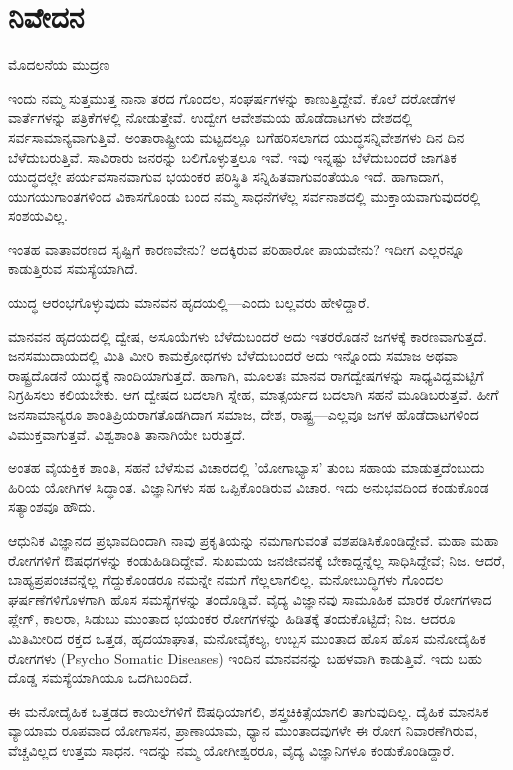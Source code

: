 
\chapter*{ನಿವೇದನ}

\begin{center}
ಮೊದಲನೆಯ ಮುದ್ರಣ
\end{center}

ಇಂದು ನಮ್ಮ ಸುತ್ತಮುತ್ತ ನಾನಾ ತರದ ಗೊಂದಲ, ಸಂಘರ್ಷಗಳನ್ನು ಕಾಣುತ್ತಿದ್ದೇವೆ. ಕೊಲೆ ದರೋಡೆಗಳ ವಾರ್ತೆಗಳನ್ನು ಪತ್ರಿಕೆಗಳಲ್ಲಿ ನೋಡುತ್ತೇವೆ. ಉದ್ವೇಗ ಆವೇಶಮಯ ಹೊಡೆದಾಟಗಳು ದೇಶದಲ್ಲಿ ಸರ್ವಸಾಮಾನ್ಯವಾಗುತ್ತಿವೆ. ಅಂತಾರಾಷ್ಟ್ರೀಯ ಮಟ್ಟದಲ್ಲೂ ಬಗೆಹರಿಸಲಾಗದ ಯುದ್ಧಸನ್ನಿವೇಶಗಳು ದಿನ ದಿನ ಬೆಳೆದುಬರುತ್ತಿವೆ. ಸಾವಿರಾರು ಜನರನ್ನು ಬಲಿಗೊಳ್ಳುತ್ತಲೂ ಇವೆ. ಇವು ಇನ್ನಷ್ಟು ಬೆಳೆದುಬಂದರೆ ಜಾಗತಿಕ ಯುದ್ಧದಲ್ಲೇ ಪರ್ಯವಸಾನವಾಗುವ ಭಯಂಕರ ಪರಿಸ್ಥಿತಿ ಸನ್ನಿಹಿತವಾಗುವಂತೆಯೂ ಇದೆ. ಹಾಗಾದಾಗ, ಯುಗಯುಗಾಂತಗಳಿಂದ ವಿಕಾಸಗೊಂಡು ಬಂದ ನಮ್ಮ ಸಾಧನೆಗಳೆಲ್ಲ ಸರ್ವನಾಶದಲ್ಲಿ ಮುಕ್ತಾಯವಾಗುವುದರಲ್ಲಿ ಸಂಶಯವಿಲ್ಲ.

ಇಂತಹ ವಾತಾವರಣದ ಸೃಷ್ಟಿಗೆ ಕಾರಣವೇನು? ಅದಕ್ಕಿರುವ ಪರಿಹಾರೋ ಪಾಯವೇನು? ಇದೀಗ ಎಲ್ಲರನ್ನೂ ಕಾಡುತ್ತಿರುವ ಸಮಸ್ಯೆಯಾಗಿದೆ.

 ಯುದ್ಧ ಆರಂಭಗೊಳ್ಳುವುದು ಮಾನವನ ಹೃದಯಲ್ಲಿ—ಎಂದು ಬಲ್ಲವರು ಹೇಳಿದ್ದಾರೆ.

ಮಾನವನ ಹೃದಯದಲ್ಲಿ ದ್ವೇಷ, ಅಸೂಯೆಗಳು ಬೆಳೆದುಬಂದರೆ ಅದು ಇತರರೊಡನೆ ಜಗಳಕ್ಕೆ ಕಾರಣವಾಗುತ್ತದೆ. ಜನಸಮುದಾಯದಲ್ಲಿ ಮಿತಿ ಮೀರಿ ಕಾಮಕ್ರೋಧಗಳು ಬೆಳೆದುಬಂದರೆ ಅದು ಇನ್ನೊಂದು ಸಮಾಜ ಅಥವಾ ರಾಷ್ಟ್ರದೊಡನೆ ಯುದ್ಧಕ್ಕೆ ನಾಂದಿಯಾಗುತ್ತದೆ. ಹಾಗಾಗಿ, ಮೂಲತಃ ಮಾನವ ರಾಗದ್ವೇಷಗಳನ್ನು ಸಾಧ್ಯವಿದ್ದಮಟ್ಟಿಗೆ ನಿಗ್ರಹಿಸಲು ಕಲಿಯಬೇಕು. ಆಗ ದ್ವೇಷದ ಬದಲಾಗಿ ಸ್ನೇಹ, ಮಾತ್ಸರ್ಯದ ಬದಲಾಗಿ ಸಹನೆ ಮೂಡಿಬರುತ್ತವೆ. ಹೀಗೆ ಜನಸಾಮಾನ್ಯರೂ ಶಾಂತಿಪ್ರಿಯರಾಗತೊಡಗಿದಾಗ ಸಮಾಜ, ದೇಶ, ರಾಷ್ಟ್ರ—ಎಲ್ಲವೂ ಜಗಳ ಹೊಡೆದಾಟಗಳಿಂದ ವಿಮುಕ್ತವಾಗುತ್ತವೆ. ವಿಶ್ವಶಾಂತಿ ತಾನಾಗಿಯೇ ಬರುತ್ತದೆ.

ಅಂತಹ ವೈಯಕ್ತಿಕ ಶಾಂತಿ, ಸಹನೆ ಬೆಳೆಸುವ ವಿಚಾರದಲ್ಲಿ 'ಯೋಗಾಭ್ಯಾಸ' ತುಂಬ ಸಹಾಯ ಮಾಡುತ್ತದೆಂಬುದು ಹಿರಿಯ ಯೋಗಿಗಳ ಸಿದ್ಧಾಂತ. ವಿಜ್ಞಾನಿಗಳು ಸಹ ಒಪ್ಪಿಕೊಂಡಿರುವ ವಿಚಾರ. ಇದು ಅನುಭವದಿಂದ ಕಂಡುಕೊಂಡ ಸತ್ಯಾಂಶವೂ ಹೌದು.

ಆಧುನಿಕ ವಿಜ್ಞಾನದ ಪ್ರಭಾವದಿಂದಾಗಿ ನಾವು ಪ್ರಕೃತಿಯನ್ನು ನಮಗಾಗುವಂತೆ ವಶಪಡಿಸಿಕೊಂಡಿದ್ದೇವೆ. ಮಹಾ ಮಹಾ ರೋಗಗಳಿಗೆ ಔಷಧಗಳನ್ನು ಕಂಡುಹಿಡಿದಿದ್ದೇವೆ. ಸುಖಮಯ ಜನಜೀವನಕ್ಕೆ ಬೇಕಾದ್ದನ್ನೆಲ್ಲ ಸಾಧಿಸಿದ್ದೇವೆ; ನಿಜ. ಆದರೆ, ಬಾಹ್ಯಪ್ರಪಂಚವನ್ನೆಲ್ಲ ಗೆದ್ದುಕೊಂಡರೂ ನಮನ್ನೇ ನಮಗೆ ಗೆಲ್ಲಲಾಗಲಿಲ್ಲ. ಮನೋಬುದ್ಧಿಗಳು ಗೊಂದಲ ಘರ್ಷಣೆಗಳಿಗೊಳಗಾಗಿ ಹೊಸ ಸಮಸ್ಯೆಗಳನ್ನು ತಂದೊಡ್ಡಿವೆ. ವೈದ್ಯ ವಿಜ್ಞಾನವು ಸಾಮೂಹಿಕ ಮಾರಕ ರೋಗಗಳಾದ ಪ್ಲೇಗ್, ಕಾಲರಾ, ಸಿಡುಬು ಮುಂತಾದ ಭಯಂಕರ ರೋಗಗಳನ್ನು ಹಿಡಿತಕ್ಕೆ ತಂದುಕೊಟ್ಟಿದೆ; ನಿಜ. ಆದರೂ ಮಿತಿಮೀರಿದ ರಕ್ತದ ಒತ್ತಡ, ಹೃದಯಾಘಾತ, ಮನೋವೈಕಲ್ಯ, ಉಬ್ಬಸ ಮುಂತಾದ ಹೊಸ ಹೊಸ ಮನೋದೈಹಿಕ ರೋಗಗಳು (Psycho Somatic Diseases) ಇಂದಿನ ಮಾನವನನ್ನು ಬಹಳವಾಗಿ ಕಾಡುತ್ತಿವೆ. ಇದು ಬಹು ದೊಡ್ಡ ಸಮಸ್ಯೆಯಾಗಿಯೂ ಒದಗಿಬಂದಿದೆ.

ಈ ಮನೋದೈಹಿಕ ಒತ್ತಡದ  ಕಾಯಿಲೆಗಳಿಗೆ ಔಷಧಿಯಾಗಲಿ, ಶಸ್ತ್ರಚಿಕಿತ್ಸೆಯಾಗಲಿ ತಾಗುವುದಿಲ್ಲ. ದೈಹಿಕ ಮಾನಸಿಕ ವ್ಯಾಯಾಮ ರೂಪವಾದ ಯೋಗಾಸನ, ಪ್ರಾಣಾಯಾಮ, ಧ್ಯಾನ ಮುಂತಾದವುಗಳೇ ಈ ರೋಗ ನಿವಾರಣೆಗಿರುವ, ವೆಚ್ಚವಿಲ್ಲದ ಉತ್ತಮ ಸಾಧನ. ಇದನ್ನು ನಮ್ಮ ಯೋಗೀಶ್ವರರೂ, ವೈದ್ಯ ವಿಜ್ಞಾನಿಗಳೂ ಕಂಡುಕೊಂಡಿದ್ದಾರೆ.


